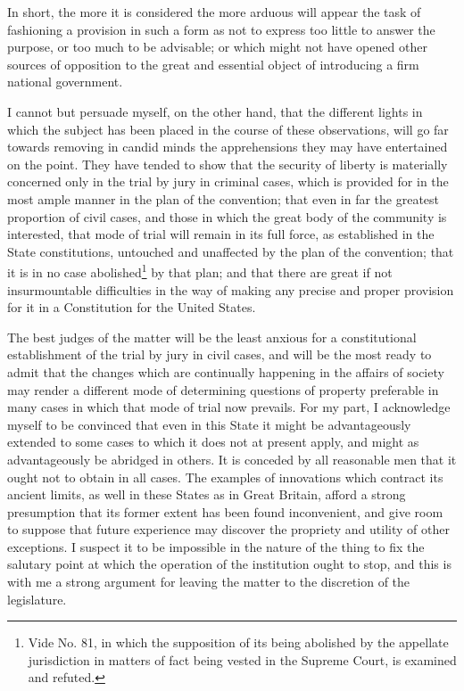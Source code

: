 In short, the more it is considered the more arduous will appear the task of fashioning a provision in such a form as not to express too little to answer the purpose, or too much to be advisable; or which might not have opened other sources of opposition to the great and essential object of introducing a firm national government.

I cannot but persuade myself, on the other hand, that the different lights in which the subject has been placed in the course of these observations, will go far towards removing in candid minds the apprehensions they may have entertained on the point. 
They have tended to show that the security of liberty is materially concerned only in the trial by jury in criminal cases, which is provided for in the most ample manner in the plan of the convention; that even in far the greatest proportion of civil cases, and those in which the great body of the community is interested, that mode of trial will remain in its full force, as established in the State constitutions, untouched and unaffected by the plan of the convention; that it is in no case abolished\footnote{Vide No. 
81, in which the supposition of its being abolished by the appellate jurisdiction in matters of fact being vested in the Supreme Court, is examined and refuted.} by that plan; and that there are great if not insurmountable difficulties in the way of making any precise and proper provision for it in a Constitution for the United States.

The best judges of the matter will be the least anxious for a constitutional establishment of the trial by jury in civil cases, and will be the most ready to admit that the changes which are continually happening in the affairs of society may render a different mode of determining questions of property preferable in many cases in which that mode of trial now prevails. 
For my part, I acknowledge myself to be convinced that even in this State it might be advantageously extended to some cases to which it does not at present apply, and might as advantageously be abridged in others. 
It is conceded by all reasonable men that it ought not to obtain in all cases. 
The examples of innovations which contract its ancient limits, as well in these States as in Great Britain, afford a strong presumption that its former extent has been found inconvenient, and give room to suppose that future experience may discover the propriety and utility of other exceptions. 
I suspect it to be impossible in the nature of the thing to fix the salutary point at which the operation of the institution ought to stop, and this is with me a strong argument for leaving the matter to the discretion of the legislature.

